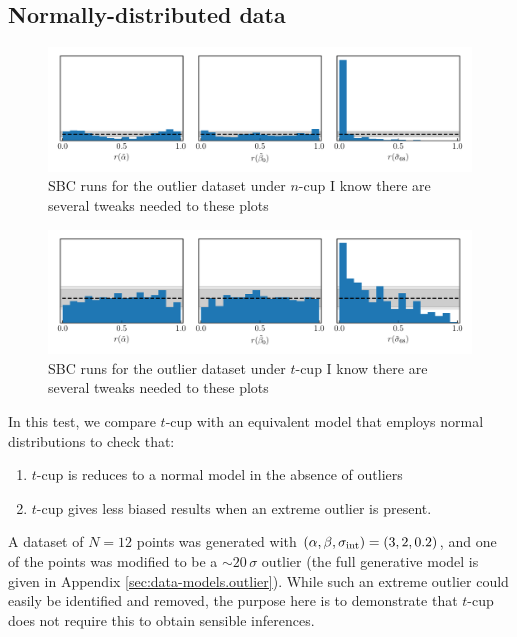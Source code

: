 \documentclass[fleqn,usenatbib]{rasti}
\begin{document}
\subsection{Normally-distributed data}
\label{sec:results.outlier}

\begin{figure}
    \includegraphics[width=\textwidth]{graphics/sbc/ncup/outlier20/sbc.pdf}
    \caption{SBC runs for the outlier dataset under $n$-cup {\color{red} I know
    there are several tweaks needed to these plots}}
    \label{fig:results.outlier.ncup-sbc}
\end{figure}

\begin{figure}
    \includegraphics[width=\textwidth]{graphics/sbc/tcup/outlier20/sbc.pdf}
    \caption{SBC runs for the outlier dataset under $t$-cup {\color{red} I know
    there are several tweaks needed to these plots}}
    \label{fig:results.outlier.tcup-sbc}
\end{figure}

In this test, we compare $t$-cup with an equivalent model that employs normal
distributions to check that:
\begin{enumerate}
    \item $t$-cup is reduces to a normal model in the absence of outliers
    \item $t$-cup gives less biased results when an extreme outlier is present.
\end{enumerate}
A dataset of $N = 12$ points was generated with $(\alpha, \beta, \sigma_{\rm
int}) = (3, 2, 0.2)$, and one of the points was modified to be a
$\sim20\,\sigma$ outlier (the full generative model is given in Appendix
\ref{sec:data-models.outlier}). While such an extreme outlier could easily be
identified and removed, the purpose here is to demonstrate that $t$-cup does not
require this to obtain sensible inferences.
\end{document}
